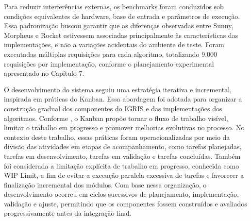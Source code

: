 Para reduzir interferências externas, os benchmarks foram conduzidos sob condições equivalentes de hardware, base de entrada e parâmetros de execução. Essa padronização buscou garantir que as diferenças observadas entre Sunny, Morpheus e Rocket estivessem associadas principalmente às características das implementações, e não a variações acidentais do ambiente de teste. Foram executadas múltiplas requisições para cada algoritmo, totalizando 9.000 requisições por implementação, conforme o planejamento experimental apresentado no Capítulo 7.

O desenvolvimento do sistema seguiu uma estratégia iterativa e incremental, inspirada em práticas do Kanban. Essa abordagem foi adotada para organizar a construção gradual dos componentes do IGRIS e das implementações dos algoritmos. Conforme , o Kanban propõe tornar o fluxo de trabalho visível, limitar o trabalho em progresso e promover melhorias evolutivas no processo. No contexto deste trabalho, essas práticas foram operacionalizadas por meio da divisão das atividades em etapas de acompanhamento, como tarefas planejadas, tarefas em desenvolvimento, tarefas em validação e tarefas concluídas. Também foi considerada a limitação explícita de trabalho em progresso, conhecida como WIP Limit, a fim de evitar a execução paralela excessiva de tarefas e favorecer a finalização incremental dos módulos. Com base nessa organização, o desenvolvimento ocorreu em ciclos sucessivos de planejamento, implementação, validação e ajuste, permitindo que os componentes fossem construídos e avaliados progressivamente antes da integração final.
